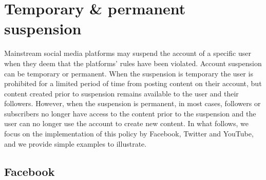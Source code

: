 \documentclass{article}
\begin{document}


\section{Temporary \& permanent suspension}

Mainstream social media platforms may suspend the account of a specific user when they deem that the platforms' rules have been violated. Account suspension can be temporary or permanent.  When the suspension is temporary the user is prohibited for a limited period of time from posting content on their account, but 
content created prior to suspension remains available to the user and their followers. However, when the suspension is permanent, in most cases, followers or subscribers 
no longer have access to the content prior to the suspension and the user can no longer use the account to create new content. In what follows, we focus on the implementation of this policy by Facebook, Twitter and YouTube, and we provide simple examples to illustrate. 

\subsection{Facebook}
\end{document}
